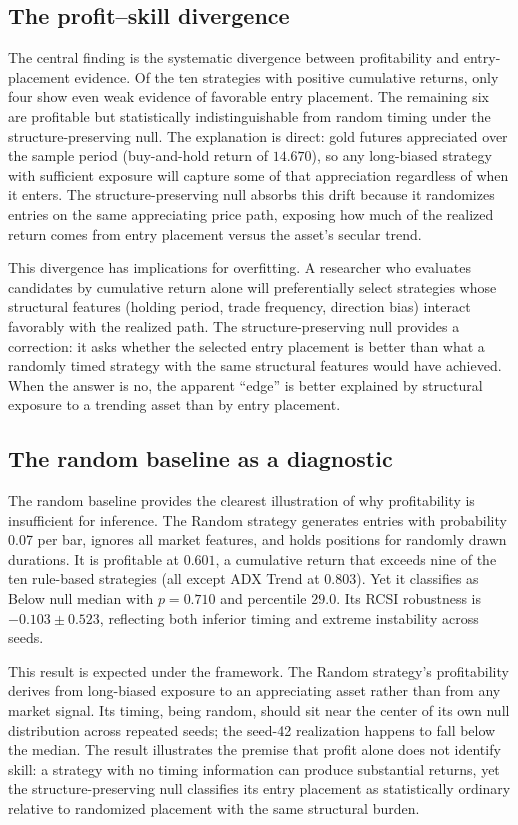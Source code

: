 \documentclass[preprint,12pt]{elsarticle}
\theoremstyle{definition}
\begin{document}
\subsection{The profit--skill divergence}

The central finding is the systematic divergence between profitability and entry-placement evidence. Of the ten strategies with positive cumulative returns, only four show even weak evidence of favorable entry placement. The remaining six are profitable but statistically indistinguishable from random timing under the structure-preserving null. The explanation is direct: gold futures appreciated over the sample period (buy-and-hold return of $14.670$), so any long-biased strategy with sufficient exposure will capture some of that appreciation regardless of when it enters. The structure-preserving null absorbs this drift because it randomizes entries on the same appreciating price path, exposing how much of the realized return comes from entry placement versus the asset's secular trend.

This divergence has implications for overfitting. A researcher who evaluates candidates by cumulative return alone will preferentially select strategies whose structural features (holding period, trade frequency, direction bias) interact favorably with the realized path. The structure-preserving null provides a correction: it asks whether the selected entry placement is better than what a randomly timed strategy with the same structural features would have achieved. When the answer is no, the apparent ``edge'' is better explained by structural exposure to a trending asset than by entry placement.

\subsection{The random baseline as a diagnostic}

The random baseline provides the clearest illustration of why profitability is insufficient for inference. The Random strategy generates entries with probability 0.07 per bar, ignores all market features, and holds positions for randomly drawn durations. It is profitable at $0.601$, a cumulative return that exceeds nine of the ten rule-based strategies (all except ADX Trend at $0.803$). Yet it classifies as Below null median with $p=0.710$ and percentile $29.0$. Its RCSI robustness is $-0.103 \pm 0.523$, reflecting both inferior timing and extreme instability across seeds.

This result is expected under the framework. The Random strategy's profitability derives from long-biased exposure to an appreciating asset rather than from any market signal. Its timing, being random, should sit near the center of its own null distribution across repeated seeds; the seed-42 realization happens to fall below the median. The result illustrates the premise that profit alone does not identify skill: a strategy with no timing information can produce substantial returns, yet the structure-preserving null classifies its entry placement as statistically ordinary relative to randomized placement with the same structural burden.
\end{document}
